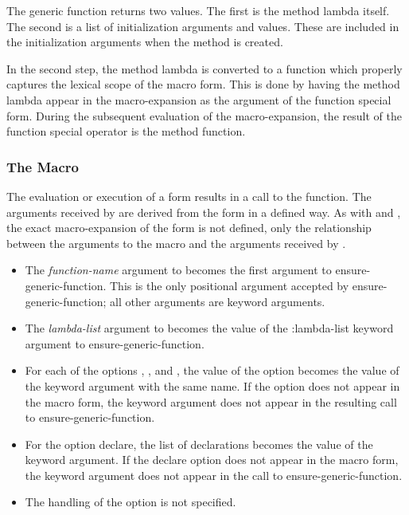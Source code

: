The generic function  returns two values. The first is
the method lambda itself. The second is a list of initialization arguments and
values. These are included in the initialization arguments when the method is
created.

In the second step, the method lambda is converted to a function which properly
captures the lexical scope of the macro form. This is done by having the method
lambda appear in the macro-expansion as the argument of the function special
form. During the subsequent evaluation of the macro-expansion, the result of the
function special operator is the method function.

\subsubsection{The  Macro}

The evaluation or execution of a  form results in a call to the
 function. The arguments received by
 are derived from the  form in a defined
way. As with  and , the exact macro-expansion of the 
form is not defined, only the relationship between the arguments to the macro
and the arguments received by .


  \begin{itemize}
  \item The \emph{function-name} argument to  becomes the first
    argument to ensure-generic-function. This is the only positional argument
    accepted by ensure-generic-function; all other arguments are keyword
    arguments.

  \item The \emph{lambda-list} argument to  becomes the value of
    the :lambda-list keyword argument to ensure-generic-function.

  \item For each of the options ,
    ,  and ,
    the value of the option becomes the value of the keyword argument with the
    same name. If the option does not appear in the macro form, the keyword
    argument does not appear in the resulting call to ensure-generic-function.

  \item For the option declare, the list of declarations becomes the value of
    the  keyword argument. If the declare option does not
    appear in the macro form, the  keyword argument does not
    appear in the call to ensure-generic-function.

  \item The handling of the  option is not specified.
  \end{itemize}


